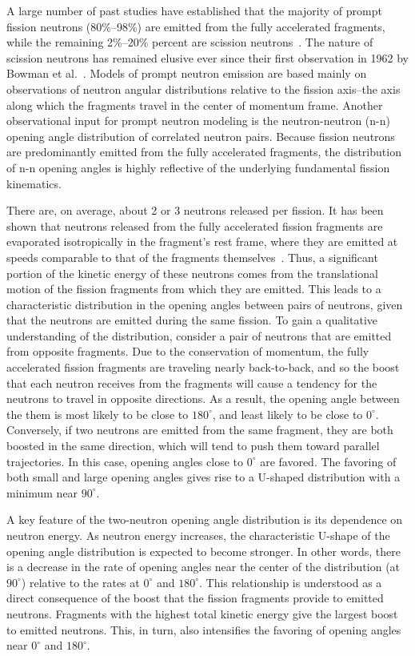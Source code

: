 A large number of past studies have established that the majority of prompt fission neutrons (80\%--98\%) are emitted from the fully accelerated fragments, while the remaining 2\%--20\% percent are scission neutrons~\cite{Scission2005}.
The nature of scission neutrons has remained elusive ever since their first observation in 1962 by Bowman et al.~\cite{Bowman}.
Models of prompt neutron emission are based mainly on observations of neutron angular distributions relative to the fission axis--the axis along which the fragments travel in the center of momentum frame.
Another observational input for prompt neutron modeling is the neutron-neutron (n-n) opening angle distribution of correlated neutron pairs.
Because fission neutrons are predominantly emitted from the fully accelerated fragments, the distribution of n-n opening angles is highly reflective of the underlying fundamental fission kinematics.

There are, on average, about 2 or 3 neutrons released per fission.
It has been shown that neutrons released from the fully accelerated fission fragments are evaporated isotropically in the fragment's rest frame, where they are emitted at speeds comparable to that of the fragments themselves~\cite{fragmentRestFrame}.
Thus, a significant portion of the kinetic energy of these neutrons comes from the translational motion of the fission fragments from which they are emitted.
This leads to a characteristic distribution in the opening angles between pairs of neutrons, given that the neutrons are emitted during the same fission.
To gain a qualitative understanding of the distribution, consider a pair of neutrons that are emitted from opposite fragments.
Due to the conservation of momentum, the fully accelerated fission fragments are traveling nearly back-to-back, and so the boost that each neutron receives from the fragments will cause a tendency for the neutrons to travel in opposite directions.
As a result, the opening angle between the them is most likely to be close to $180^{\circ}$, and least likely to be close to $0^{\circ}$.
Conversely, if two neutrons are emitted from the same fragment, they are both boosted in the same direction, which will tend to push them toward parallel trajectories.
In this case, opening angles close to $0^{\circ}$ are favored.
The favoring of both small and large opening angles gives rise to a U-shaped distribution with a minimum near $90^{\circ}$.

A key feature of the two-neutron opening angle distribution is its dependence on neutron energy.
As neutron energy increases, the characteristic U-shape of the opening angle distribution is expected to become stronger.
In other words, there is a decrease in the rate of opening angles near the center of the distribution (at $90^{\circ}$) relative to the rates at $0^{\circ}$ and $180^{\circ}$.
This relationship is understood as a direct consequence of the boost that the fission fragments provide to emitted neutrons.
Fragments with the highest total kinetic energy give the largest boost to emitted neutrons.
This, in turn, also intensifies the favoring of opening angles near $0^{\circ}$ and $180^{\circ}$.

